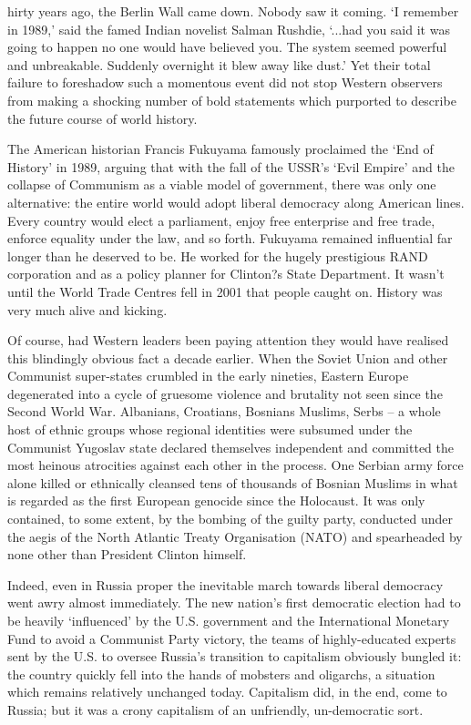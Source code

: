 \label{ch:suddenly-it-blew-away-like-dust}

hirty years ago, the Berlin Wall came down. Nobody saw it coming. `I
   remember in 1989,' said the famed Indian novelist Salman Rushdie,
   `...had you said it was going to happen no one would have believed you.
   The system seemed powerful and unbreakable. Suddenly overnight it blew
   away like dust.' Yet their total failure to foreshadow such a momentous
   event did not stop Western observers from making a shocking number of
   bold statements which purported to describe the future course of world
   history.

   The American historian Francis Fukuyama famously proclaimed the `End of
   History' in 1989, arguing that with the fall of the USSR's `Evil
   Empire' and the collapse of Communism as a viable model of government,
   there was only one alternative: the entire world would adopt liberal
   democracy along American lines. Every country would elect a parliament,
   enjoy free enterprise and free trade, enforce equality under the law,
   and so forth. Fukuyama remained influential far longer than he deserved
   to be. He worked for the hugely prestigious RAND corporation and as a
   policy planner for Clinton?s State Department. It wasn't until the
   World Trade Centres fell in 2001 that people caught on. History was
   very much alive and kicking.

   Of course, had Western leaders been paying attention they would have
   realised this blindingly obvious fact a decade earlier. When the Soviet
   Union and other Communist super-states crumbled in the early nineties,
   Eastern Europe degenerated into a cycle of gruesome violence and
   brutality not seen since the Second World War. Albanians, Croatians,
   Bosnians Muslims, Serbs -- a whole host of ethnic groups whose regional
   identities were subsumed under the Communist Yugoslav state declared
   themselves independent and committed the most heinous atrocities
   against each other in the process. One Serbian army force alone killed
   or ethnically cleansed tens of thousands of Bosnian Muslims in what is
   regarded as the first European genocide since the Holocaust. It was
   only contained, to some extent, by the bombing of the guilty party,
   conducted under the aegis of the North Atlantic Treaty Organisation
   (NATO) and spearheaded by none other than President Clinton himself.

   Indeed, even in Russia proper the inevitable march towards liberal
   democracy went awry almost immediately. The new nation's first
   democratic election had to be heavily `influenced' by the U.S.
   government and the International Monetary Fund to avoid a Communist
   Party victory, the teams of highly-educated experts sent by the U.S. to
   oversee Russia's transition to capitalism obviously bungled it: the
   country quickly fell into the hands of mobsters and oligarchs, a
   situation which remains relatively unchanged today. Capitalism did, in
   the end, come to Russia; but it was a crony capitalism of an
   unfriendly, un-democratic sort.

